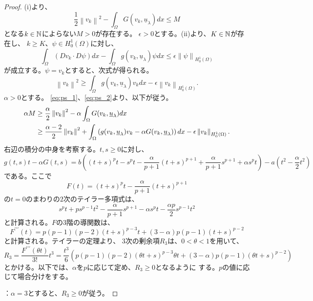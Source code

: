 \begin{proof}
 (i)より、
 \begin{equation}
  \frac{1}{2} \left\| v_k \right\|^2 - \int_\Omega G(v_k,
   \underline{u}_\lambda )dx \leq M \label{eq:ps_1}
 \end{equation}
 となる$k \in \mathbb{N}$によらない$M > 0$が存在する。
 $\epsilon > 0$とする。(ii)より、$K \in \mathbb{N}$が存在し、
 $k \geq K$、$\psi \in H_0^1(\Omega)$に対し、
 \[
  \int_\Omega (D v_k \cdot D \psi) dx - \int_\Omega g(v_k,
 \underline{u}_\lambda)\psi dx \leq \epsilon \left\| \psi
 \right\|_{H_0^1(\Omega) }
 \]
 が成立する。$\psi = v_k$とすると、次式が得られる。
 \begin{equation}
  \left\| v_k \right\|^2 \geq \int_\Omega g(v_k,
   \underline{u}_\lambda)v_k dx - \epsilon \left\| v_k
   \right\|_{H_0^1(\Omega)}. \label{eq:ps_2}
 \end{equation}
 $\alpha > 0$とする。
 \eqref{eq:ps_1}、\eqref{eq:ps_2}より、以下が従う。
 \begin{align}
  \alpha M &\geq  \frac{\alpha}{2} \left\| v_k \right\|^2 - \alpha
  \int_\Omega G(v_k, \underline{u}_\lambda) dx \notag \\
  & \geq \frac{\alpha-2}{2} \left\| v_k \right\|^2 + \int_\Omega 
  \left( g(v_k, \underline{u}_\lambda)v_k - \alpha G(v_k,
  \underline{u}_\lambda)  \right) dx - \epsilon \left\| v_k
  \right\|_{H^1_0(\Omega)}. \label{eq:alpha_M}
 \end{align}
 右辺の積分の中身を考察する。$t, s \geq 0$に対し、
 \[
   g(t, s)t - \alpha G(t, s)
  = b \left( (t+s)^p t - s^p t - \frac{\alpha}{p+1}(t+s)^{p+1} +
  \frac{\alpha}{p+1}s^{p+1} + \alpha s^p t \right) - a \left( t^2 -
  \frac{\alpha}{2} t^2 \right)
 \]
 である。ここで
 \[
  F(t) = (t+s)^p t - \frac{\alpha}{p+1}(t+s)^{p+1}
 \]
 の$t = 0$のまわりの$2$次のテイラー多項式は、
 \[
 s^pt + ps^{p-1} t^2 - \frac{\alpha}{p+1} s^{p+1} - \alpha s^p t -
 \frac{\alpha p}{2} s^{p-1} t^2 
 \]
 と計算される。$F$の$3$階の導関数は、
 \[
  F^{\prime\prime\prime}(t) = p(p-1)(p-2)(t+s)^{p-3} t + (3 - \alpha)
 p(p-1) (t+s)^{p-2}
 \]
 と計算される。テイラーの定理より、
 $3$次の剰余項$R_3$は、$0 < \theta < 1$を用いて、
 \[
  R_3 = \frac{F^{\prime\prime\prime}(\theta t)}{3!}t^3 = \frac{t^3}{6}
 \left( p(p-1)(p-2)(\theta t + s)^{p-3} \theta t + (3-\alpha) p(p-1)
 (\theta t + s)^{p-2} \right)
 \]
 とかける。以下では、$\alpha$を$p$に応じて定め、$R_3 \geq 0$となるように
 する。$p$の値に応じて場合分けをする。

 ：$\alpha = 3$とすると、$R_3 \geq 0$が従う。


\end{proof}
